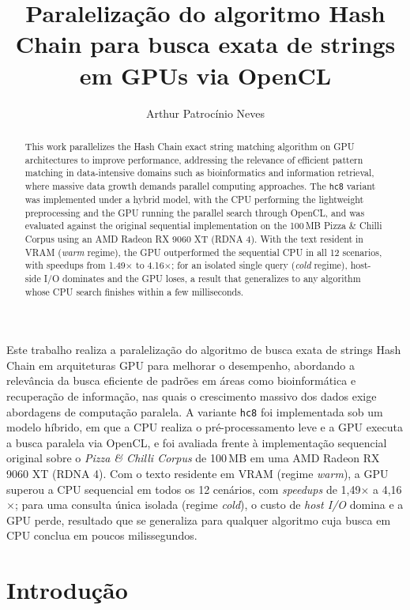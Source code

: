 \documentclass[12pt]{article}
\title{Paralelização do algoritmo Hash Chain para busca exata de strings em GPUs via OpenCL}
\author{Arthur Patrocínio Neves\inst{1}}
\begin{document}
\maketitle

\begin{abstract}
This work parallelizes the Hash Chain exact string matching algorithm on GPU architectures to improve performance, addressing the relevance of efficient pattern matching in data-intensive domains such as bioinformatics and information retrieval, where massive data growth demands parallel computing approaches. The \texttt{hc8} variant was implemented under a hybrid model, with the CPU performing the lightweight preprocessing and the GPU running the parallel search through OpenCL, and was evaluated against the original sequential implementation on the 100\,MB Pizza \& Chilli Corpus using an AMD Radeon RX 9060 XT (RDNA 4). With the text resident in VRAM (\textit{warm} regime), the GPU outperformed the sequential CPU in all 12 scenarios, with speedups from 1.49$\times$ to 4.16$\times$; for an isolated single query (\textit{cold} regime), host-side I/O dominates and the GPU loses, a result that generalizes to any algorithm whose CPU search finishes within a few milliseconds.
\end{abstract}

\begin{resumo}
Este trabalho realiza a paralelização do algoritmo de busca exata de strings Hash Chain em arquiteturas GPU para melhorar o desempenho, abordando a relevância da busca eficiente de padrões em áreas como bioinformática e recuperação de informação, nas quais o crescimento massivo dos dados exige abordagens de computação paralela. A variante \texttt{hc8} foi implementada sob um modelo híbrido, em que a CPU realiza o pré-processamento leve e a GPU executa a busca paralela via OpenCL, e foi avaliada frente à implementação sequencial original sobre o \textit{Pizza \& Chilli Corpus} de 100\,MB em uma AMD Radeon RX 9060 XT (RDNA 4). Com o texto residente em VRAM (regime \textit{warm}), a GPU superou a CPU sequencial em todos os 12 cenários, com \textit{speedups} de 1,49$\times$ a 4,16$\times$; para uma consulta única isolada (regime \textit{cold}), o custo de \textit{host I/O} domina e a GPU perde, resultado que se generaliza para qualquer algoritmo cuja busca em CPU conclua em poucos milissegundos.
\end{resumo}

\section{Introdução}
\end{document}
